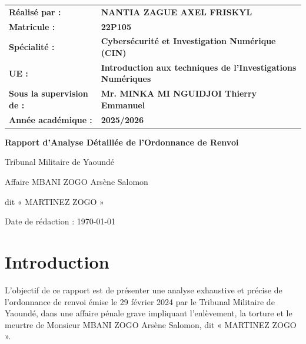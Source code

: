 \documentclass[12pt,a4paper]{article}
\begin{document}
\begin{titlepage}
		\begin{tabular}{@{}>{\bfseries}l l@{}}
			\vspace{0.5cm}
			Réalisé par : & \textbf{NANTIA ZAGUE AXEL FRISKYL} \\
			\vspace{0.5cm}
			Matricule : & \textbf{22P105} \\
			\vspace{0.5cm}
			Spécialité : & \textbf{Cybersécurité et Investigation Numérique (CIN)} \\
			\vspace{0.5cm}
			UE : & \textbf{Introduction aux techniques de l'Investigations Numériques} \\
			\vspace{0.5cm}
			Sous la supervision de : & \textbf{Mr. MINKA MI NGUIDJOI Thierry Emmanuel} \\
			\vspace{0.5cm}
			Année académique : & \textbf{2025/2026} \\
		\end{tabular}
		
	\end{titlepage}
	
	\thispagestyle{empty}
	\newpage
	\begin{titlepage}
		\centering
		\vspace*{2cm}
		{\Huge\bfseries Rapport d'Analyse Détaillée de l'Ordonnance de Renvoi\par}
		\vspace{1cm}
		{\large Tribunal Militaire de Yaoundé\par}
		{\large Affaire MBANI ZOGO Arsène Salomon\par}
		{\large dit « MARTINEZ ZOGO »\par}
		\vspace{2cm}
		{\large Date de rédaction : \today\par}
		\vfill
	\end{titlepage}
	
	\section*{Introduction}
	
	L'objectif de ce rapport est de présenter une analyse exhaustive et précise de l'ordonnance de renvoi émise le 29 février 2024 par le Tribunal Militaire de Yaoundé, dans une affaire pénale grave impliquant l'enlèvement, la torture et le meurtre de Monsieur MBANI ZOGO Arsène Salomon, dit « MARTINEZ ZOGO ».
	
\end{document}
